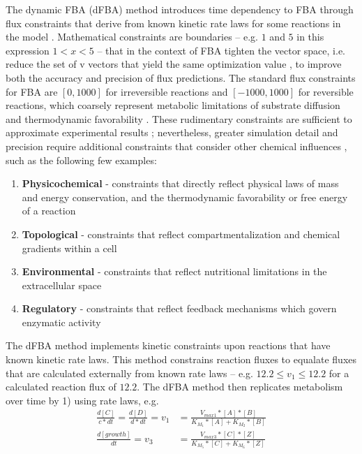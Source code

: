 The dynamic FBA (dFBA) method introduces time dependency to FBA through flux constraints that derive from known kinetic rate laws for some reactions in the model \cite{Machado2012ExploringMetabolism, Pernice2019IntegratingPractice, Mahadevan2002DynamicColi,Mahadevan2003TheModels}. Mathematical constraints are boundaries -- e.g. $1$ and $5$ in this expression $1<x<5$ -- that in the context of FBA tighten the vector space, i.e. reduce the set of v vectors that yield the same optimization value \cite{Covert2008IntegratingColi}, to improve both the accuracy and precision of flux predictions. The standard flux constraints for FBA are $[0,1000]$ for irreversible reactions and $[-1000,1000]$ for reversible reactions, which coarsely represent metabolic limitations of substrate diffusion and thermodynamic favorability \cite{Peres2017HowModes}. These rudimentary constraints are sufficient to approximate experimental results \cite{Edwards2001InData, Kauffman2003AdvancesAnalysis}; nevertheless, greater simulation detail and precision \cite{Magnusdottir2017GenerationMicrobiota} require additional constraints that consider other chemical influences \cite{Fleming2010IntegratedMetabolism}, such as the following few examples: 
\begin{enumerate}
    \item \textbf{Physicochemical} - constraints that directly reflect physical laws of mass and energy conservation, and the thermodynamic favorability or free energy of a reaction \cite{Henry2007}
    \item \textbf{Topological} - constraints that reflect compartmentalization and chemical gradients within a cell \cite{Price2004Genome-scaleConstraints}
    \item \textbf{Environmental} - constraints that reflect nutritional limitations in the extracellular space 
    \item \textbf{Regulatory} - constraints that reflect feedback mechanisms which govern enzymatic activity \cite{Covert2001RegulationMetabolism}
\end{enumerate}
The dFBA method implements kinetic constraints upon reactions that have known kinetic rate laws. This method constrains reaction fluxes to equalate fluxes that are calculated externally from known rate laws -- e.g. $12.2\le v_1 \le 12.2$ for a calculated reaction flux of $12.2$. The dFBA method then replicates metabolism over time by 1) using rate laws, e.g. 
\begin{equation} \label{rate_laws}
    \begin{split}
        \frac{d[C]}{c*dt} = \frac{d[D]}{d*dt} = v_1 &= \frac{V_{max1}*[A]*[B]}{K_{M_1}*[A]+K_{M_2}*[B]} \\
        \frac{d[growth]}{dt} = v_3 &= \frac{V_{max3}*[C]*[Z]}{K_{M_5}*[C]+K_{M_6}*[Z]}
    \end{split}
\end{equation}

